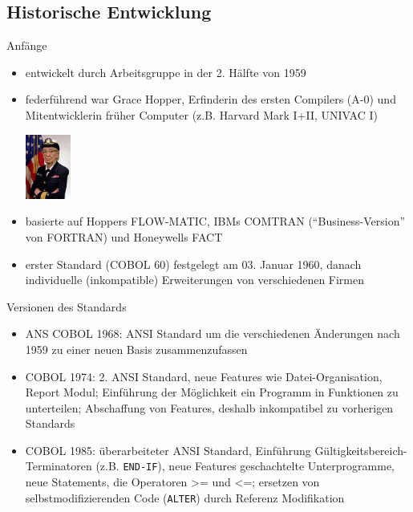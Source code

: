 \documentclass[handout]{beamer}
\begin{document}
\subsection{Historische Entwicklung}
\begin{frame}{Anfänge}
	\begin{itemize}[<+->]
		\item
			entwickelt durch Arbeitsgruppe in der 2. H\"alfte von 1959
		\item
  \begin{minipage}[t]{0.7\textwidth}
	federführend war Grace Hopper, Erfinderin des ersten Compilers (A-0) und Mitentwicklerin fr\"uher Computer (z.B. Harvard Mark I+II, UNIVAC I)
	\end{minipage}\hspace{2pt}
	\begin{minipage}[t]{0.15\textwidth}
	\vspace{-12pt}%
    \includegraphics[width=1.5cm]{Grace_Hopper_small}
	\end{minipage}
		\item
			basierte auf Hoppers FLOW-MATIC, IBMs COMTRAN (``Business-Version'' von FORTRAN) und Honeywells FACT
		\item
		erster Standard (COBOL 60) festgelegt am 03. Januar 1960, danach individuelle (inkompatible) Erweiterungen von verschiedenen Firmen
	\end{itemize}
\end{frame}

\begin{frame}{Versionen des Standards}
	\begin{itemize}[<+->]
		\item
			ANS COBOL 1968: ANSI Standard um die verschiedenen \"Anderungen nach 1959 zu einer neuen Basis zusammenzufassen
		\item
			COBOL 1974: 2. ANSI Standard, neue Features wie Datei-Organisation, Report Modul; Einführung der Möglichkeit ein Programm in Funktionen zu unterteilen; Abschaffung von Features, deshalb inkompatibel zu vorherigen Standards
		\item
			COBOL 1985: \"uberarbeiteter ANSI Standard, Einf\"uhrung G\"ultigkeitsbereich-Terminatoren (z.B. \texttt{END-IF}), neue Features geschachtelte Unterprogramme, neue Statements, die Operatoren >= und <=; ersetzen von selbstmodifizierenden Code (\texttt{ALTER}) durch Referenz Modifikation
	\end{itemize}
\end{frame}
\end{document}

